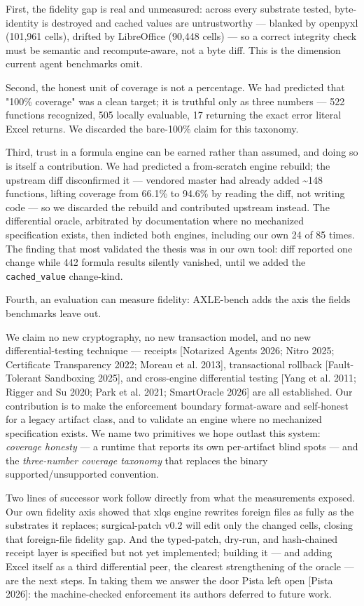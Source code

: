 \documentclass[
]{article}
\begin{document}
First, the fidelity gap is real and unmeasured: across every substrate
tested, byte-identity is destroyed and cached values are untrustworthy
--- blanked by openpyxl (101,961 cells), drifted by LibreOffice (90,448
cells) --- so a correct integrity check must be semantic and
recompute-aware, not a byte diff. This is the dimension current agent
benchmarks omit.

Second, the honest unit of coverage is not a percentage. We had
predicted that "100\% coverage" was a clean target; it is truthful only
as three numbers --- 522 functions recognized, 505 locally evaluable, 17
returning the exact error literal Excel returns. We discarded the
bare-100\% claim for this taxonomy.

Third, trust in a formula engine can be earned rather than assumed, and
doing so is itself a contribution. We had predicted a from-scratch
engine rebuild; the upstream diff disconfirmed it --- vendored master
had already added \textasciitilde148 functions, lifting coverage from
66.1\% to 94.6\% by reading the diff, not writing code --- so we
discarded the rebuild and contributed upstream instead. The differential
oracle, arbitrated by documentation where no mechanized specification
exists, then indicted both engines, including our own 24 of 85 times.
The finding that most validated the thesis was in our own tool: diff
reported one change while 442 formula results silently vanished, until
we added the \texttt{cached\_value} change-kind.

Fourth, an evaluation can measure fidelity: AXLE-bench adds the axis the
field\textquotesingle s benchmarks leave out.

We claim no new cryptography, no new transaction model, and no new
differential-testing technique --- receipts {[}Notarized Agents 2026;
Nitro 2025; Certificate Transparency 2022; Moreau et al. 2013{]},
transactional rollback {[}Fault-Tolerant Sandboxing 2025{]}, and
cross-engine differential testing {[}Yang et al. 2011; Rigger and Su
2020; Park et al. 2021; SmartOracle 2026{]} are all established. Our
contribution is to make the enforcement boundary format-aware and
self-honest for a legacy artifact class, and to validate an engine where
no mechanized specification exists. We name two primitives we hope
outlast this system: \emph{coverage honesty} --- a runtime that reports
its own per-artifact blind spots --- and the \emph{three-number coverage
taxonomy} that replaces the binary supported/unsupported convention.

Two lines of successor work follow directly from what the measurements
exposed. Our own fidelity axis showed that xlq\textquotesingle s engine
rewrites foreign files as fully as the substrates it replaces;
surgical-patch v0.2 will edit only the changed cells, closing that
foreign-file fidelity gap. And the typed-patch, dry-run, and
hash-chained receipt layer is specified but not yet implemented;
building it --- and adding Excel itself as a third differential peer,
the clearest strengthening of the oracle --- are the next steps. In
taking them we answer the door Pista left open {[}Pista 2026{]}: the
machine-checked enforcement its authors deferred to future work.
\end{document}
